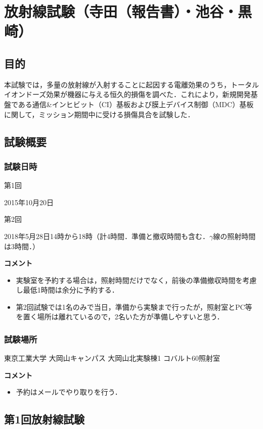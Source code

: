 \section{放射線試験（寺田（報告書）・池谷・黒崎）}

\subsection{目的}
本試験では，多量の放射線が入射することに起因する電離効果のうち，トータルイオンドーズ効果が機器に与える恒久的損傷を調べた．これにより，新規開発基盤である通信\&インヒビット（CI）基板および膜上デバイス制御（MDC）基板に関して，ミッション期間中に受ける損傷具合を試験した．

\subsection{試験概要}
\subsubsection{試験日時}
第1回

2015年10月20日

\vspace{2ex} 
第2回　

2018年5月28日14時から18時（計4時間．準備と撤収時間も含む．$\gamma$線の照射時間は3時間．）

\vspace{3ex} 
\textbf{コメント}
\begin{itemize}
\item 実験室を予約する場合は，照射時間だけでなく，前後の準備撤収時間を考慮し最低1時間は余分に予約する．
\item 第2回試験では1名のみで当日，準備から実験まで行ったが，照射室とPC等を置く場所は離れているので，2名いた方が準備しやすいと思う．
\end{itemize}
	
\subsubsection{試験場所}
東京工業大学 大岡山キャンパス 大岡山北実験棟1 コバルト60照射室

\vspace{3ex} 
\textbf{コメント}
\begin{itemize}
	\item 予約はメールでやり取りを行う．
\end{itemize}

\subsection{第1回放射線試験}
\label{1RadiationTest}

